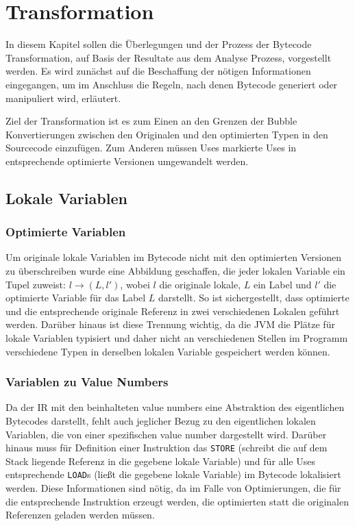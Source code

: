 \chapter{Transformation}
\label{ch:trans}

In diesem Kapitel sollen die Überlegungen und der Prozess der Bytecode Transformation,
auf Basis der Resultate aus dem Analyse Prozess, vorgestellt werden. Es wird zunächst 
auf die Beschaffung der nötigen Informationen eingegangen, um im Anschluss die Regeln,
nach denen Bytecode generiert oder manipuliert wird, erläutert.

Ziel der Transformation ist es zum Einen an den Grenzen der Bubble Konvertierungen zwischen den
Originalen und den optimierten Typen in den Sourcecode einzufügen. Zum Anderen müssen Uses
markierte Uses in entsprechende optimierte Versionen umgewandelt werden.  

\section{Lokale Variablen}
\label{sec:locals}

\subsection{Optimierte Variablen}

Um originale lokale Variablen im Bytecode nicht mit den optimierten Versionen zu 
überschreiben wurde eine Abbildung geschaffen, die jeder lokalen Variable ein Tupel 
zuweist: $l \rightarrow (L,l')$, wobei $l$ die originale lokale, $L$ ein Label und 
$l'$ die optimierte Variable für das Label $L$ darstellt. So ist sichergestellt, dass
optimierte und die entsprechende originale Referenz in zwei verschiedenen Lokalen 
geführt werden. Darüber hinaus ist diese Trennung wichtig, da die JVM die Plätze für
lokale Variablen typisiert und daher nicht an verschiedenen Stellen im Programm 
verschiedene Typen in derselben lokalen Variable gespeichert werden können.

\subsection{Variablen zu Value Numbers}

Da der IR mit den beinhalteten value numbers eine Abstraktion des eigentlichen Bytecodes
darstellt, fehlt auch jeglicher Bezug zu den eigentlichen lokalen Variablen, die von
einer spezifischen value number dargestellt wird. Darüber hinaus muss für Definition
einer Instruktion das \texttt{STORE} (schreibt die auf dem Stack liegende Referenz in 
die gegebene lokale Variable) und für alle Uses entsprechende \texttt{LOAD}s (ließt die 
gegebene lokale Variable) im Bytecode lokalisiert werden. Diese Informationen sind nötig,
da im Falle von Optimierungen, die für die entsprechende Instruktion erzeugt werden, 
die optimierten statt die originalen Referenzen geladen werden müssen.

